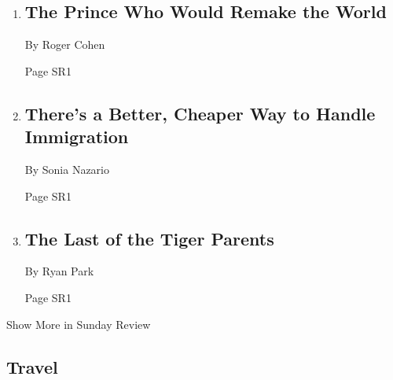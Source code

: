 \begin{enumerate}
\def\labelenumi{\arabic{enumi}.}
\item
  \href{/2018/06/21/opinion/sunday/saudi-arabia-women-drivers.html}{}

  \hypertarget{the-prince-who-would-remake-the-world}{%
  \subsection{The Prince Who Would Remake the
  World}\label{the-prince-who-would-remake-the-world}}

  By Roger Cohen

  Page SR1
\item
  \href{/2018/06/22/opinion/children-detention-trump-executive-order.html}{}

  \hypertarget{theres-a-better-cheaper-way-to-handle-immigration}{%
  \subsection{There's a Better, Cheaper Way to Handle
  Immigration}\label{theres-a-better-cheaper-way-to-handle-immigration}}

  By Sonia Nazario

  Page SR1
\item
  \href{/2018/06/22/opinion/sunday/asian-american-tiger-parents.html}{}

  \hypertarget{the-last-of-the-tiger-parents}{%
  \subsection{The Last of the Tiger
  Parents}\label{the-last-of-the-tiger-parents}}

  By Ryan Park

  Page SR1
\end{enumerate}

Show More in Sunday Review

\hypertarget{travel}{%
\subsection{Travel}\label{travel}}

